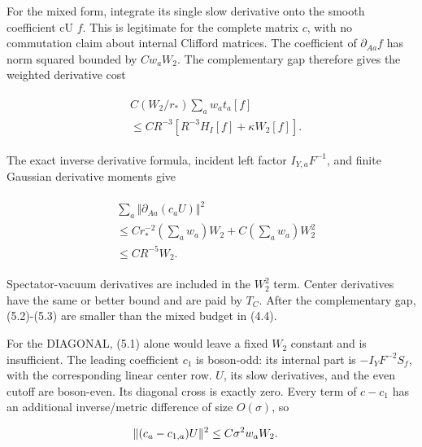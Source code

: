 For the mixed form, integrate its single slow derivative onto the smooth
coefficient cU \(f\). This is legitimate for the complete matrix \(c\),
with no commutation claim about internal Clifford matrices. The
coefficient of \(\partial _{Aa} f\) has norm squared bounded by
\(C w_{a} W_{2}\). The complementary gap therefore gives the weighted
derivative cost

\begin{gather*}
\begin{aligned}
& C(W_{2}/r_{*}) \sum _{a} w_{a} t_{a}[f] \\
& \le C R^{-3}[R^{-3}H_{I}[f]+\kappa  W_{2}[f]].
\end{aligned}\tag{5.2}
\end{gather*}

The exact inverse derivative formula, incident left factor
\(I_{Y,a} F^{-1}\), and finite Gaussian derivative moments give

\begin{gather*}
\begin{aligned}
& \sum _{a} \Vert \partial _{Aa}(c_{a} U)\Vert ^{2} \\
& \le C r_{*}^{-2}(\sum _{a} w_{a})W_{2}+C(\sum _{a} w_{a})W_{2}^{2} \\
& \le C R^{-5}W_{2}.
\end{aligned}\tag{5.3}
\end{gather*}

Spectator-vacuum derivatives are included in the \(W_{2}^{2}\) term.
Center derivatives have the same or better bound and are paid by
\(T_{C}\). After the complementary gap, (5.2)-(5.3) are smaller than the
mixed budget in (4.4).

For the DIAGONAL, (5.1) alone would leave a fixed \(W_{2}\) constant and
is insufficient. The leading coefficient \(c_{1}\) is boson-odd: its
internal part is \(-I_{Y} F^{-2}S_{f}\), with the corresponding linear
center row. \(U\), its slow derivatives, and the even cutoff are
boson-even. Its diagonal cross is exactly zero. Every term of
\(c-c_{1}\) has an additional inverse/metric difference of size
\(O(\sigma )\), so

\begin{gather*}
\begin{aligned}
& \Vert (c_{a}-c_{1,a})U\Vert ^{2}\le C \sigma ^{2} w_{a} W_{2}.
\end{aligned}\notag
\end{gather*}

